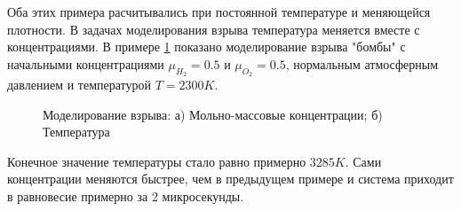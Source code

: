 Оба этих примера расчитывались при постоянной температуре и меняющейся плотности. В задачах моделирования взрыва температура меняется
вместе с концентрациями. В примере \ref{fig:bomb} показано моделирование взрыва "бомбы" с начальными концентрациями
$\mu_{H_2} = 0.5$ и $\mu_{O_2} = 0.5$, нормальным атмосферным давлением и температурой $T = 2300K$. 

\begin{figure}
    \begin{subfigure}[t]{0.45\linewidth}
        \centering
        
        \caption{}
    \end{subfigure}
    \hfill
    \begin{subfigure}[t]{0.45\linewidth}
        \centering
        
        \caption{}
    \end{subfigure}
    \hfill
    \caption{Моделирование взрыва: а) Мольно-массовые концентрации; б) Температура}
    \label{fig:bomb}
  \end{figure}

Конечное значение температуры стало равно примерно $3285K$. Сами концентрации меняются быстрее, чем в предыдущем примере и система
приходит в равновесие примерно за 2 микросекунды.